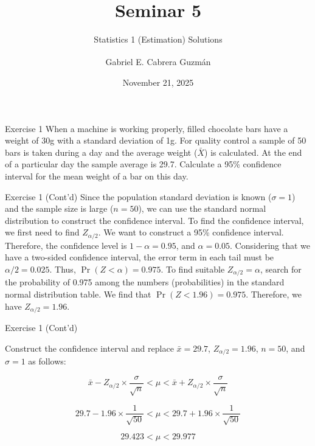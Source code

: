 \documentclass[
  ignorenonframetext,
  aspectratio=43,
]{beamer}
\title[Seminar 5]{Seminar
5\daggerfootnote{\texttt{gabriel.cabreraguzman@postgrad.manchester.ac.uk}}}
\subtitle{Statistics 1 (Estimation) Solutions}
\author[Gabriel E. Cabrera Guzmán]{
    {Gabriel E. Cabrera
Guzmán\textsuperscript{\normalsize\orcidlink{0000-0000-0000-0000}}} \medskip
}
\date{November 21, 2025}
\institute[]{
    The University of Manchester\\
Alliance Manchester Business School \bigskip
}
\begin{document}
\frame{\titlepage}
\ifdefined\Shaded\renewenvironment{Shaded}{\begin{tcolorbox}[boxrule=0pt, breakable, enhanced, borderline west={3pt}{0pt}{shadecolor}, frame hidden, sharp corners, interior hidden]}{\end{tcolorbox}}\fi

\begin{frame}{Exercise 1}
\protect\hypertarget{exercise-1}{}
When a machine is working properly, filled chocolate bars have a weight
of 30g with a standard deviation of 1g. For quality control a sample of
50 bars is taken during a day and the average weight (\(\bar{X}\)) is
calculated. At the end of a particular day the sample average is 29.7.
Calculate a 95\% confidence interval for the mean weight of a bar on
this day.
\end{frame}

\begin{frame}{Exercise 1 (Cont'd)}
\protect\hypertarget{exercise-1-contd}{}
Since the population standard deviation is known (\(\sigma = 1\)) and
the sample size is large (\(n = 50\)), we can use the standard normal
distribution to construct the confidence interval. To find the
confidence interval, we first need to find \(Z_{\alpha/2}\). We want to
construct a 95\% confidence interval. Therefore, the confidence level is
\(1-\alpha = 0.95\), and \(\alpha = 0.05\). Considering that we have a
two-sided confidence interval, the error term in each tail must be
\(\alpha/2 = 0.025\). Thus, \(\Pr(Z < \alpha) = 0.975\). To find
suitable \(Z_{\alpha/2} = \alpha\), search for the probability of 0.975
among the numbers (probabilities) in the standard normal distribution
table. We find that \(\Pr(Z < 1.96) = 0.975\). Therefore, we have
\(Z_{\alpha/2} = 1.96\).
\end{frame}

\begin{frame}{Exercise 1 (Cont'd)}
\protect\hypertarget{exercise-1-contd-1}{}
\pause

Construct the confidence interval and replace \(\bar{x} = 29.7\),
\(Z_{\alpha/2} = 1.96\), \(n = 50\), and \(\sigma = 1\) as follows:

\pause

\[
\bar{x} - Z_{\alpha/2} \times \frac{\sigma}{\sqrt{n}} < \mu < \bar{x} + Z_{\alpha/2} \times \frac{\sigma}{\sqrt{n}}
\]

\pause

\[
29.7 - 1.96 \times \frac{1}{\sqrt{50}} < \mu < 29.7 + 1.96 \times \frac{1}{\sqrt{50}}
\]

\pause

\[
29.423 < \mu < 29.977
\]
\end{frame}
\end{document}
